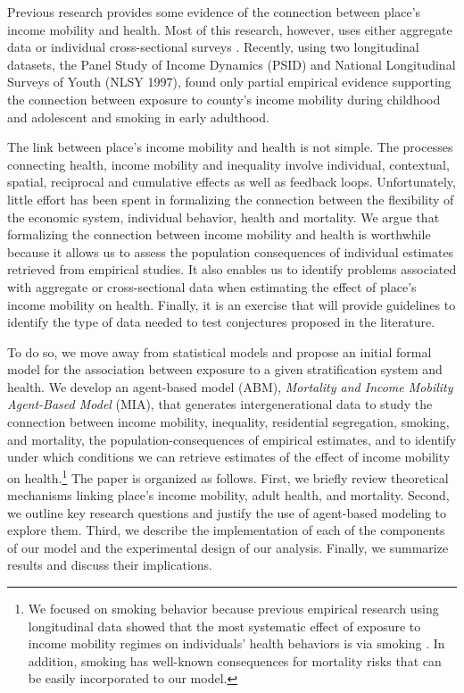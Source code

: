 \documentclass[class=article, crop=false, 12pt]{standalone}
\begin{document}
Previous research provides some evidence of the connection between place's income mobility and health. Most of this research, however, uses either aggregate data \citep{venkataramani2020, daza2018a,venkataramani2015} or individual cross-sectional surveys \citep{venkataramani2016}. Recently, using two longitudinal datasets, the Panel Study of Income Dynamics (PSID) and National Longitudinal Surveys of Youth (NLSY 1997),  \citet{daza2021} found only partial empirical evidence supporting the connection between exposure to county's income mobility during childhood and adolescent and smoking in early adulthood.

The link between place's income mobility and health is not simple. The processes connecting health, income mobility and inequality involve individual, contextual, spatial, reciprocal and cumulative effects as well as feedback loops. Unfortunately, little effort has been spent in formalizing the connection between the flexibility of the economic system, individual behavior, health and mortality. We argue that formalizing the connection between income mobility and health is worthwhile because it allows us to assess the population consequences of individual estimates retrieved from empirical studies. It also enables us to identify problems associated with aggregate or cross-sectional data when estimating the effect of place's income mobility on health. Finally, it is an exercise that will provide guidelines to identify the type of data needed to test conjectures proposed in the literature.

To do so, we move away from statistical models and propose an initial formal model for the association between exposure to a given stratification system and health. We develop an agent-based model (ABM), \textit{Mortality and Income Mobility Agent-Based Model} (MIA), that generates intergenerational data to study the connection between income mobility, inequality, residential segregation, smoking, and mortality, the population-consequences of empirical estimates, and to identify under which conditions we can retrieve estimates of the effect of income mobility on health.\footnote{We focused on smoking behavior because previous empirical research using longitudinal data showed that the most systematic effect of exposure to income mobility regimes on individuals' health behaviors is via smoking \citep{daza2021}. In addition, smoking has well-known consequences for mortality risks that can be easily incorporated to our model.} The paper is organized as follows. First, we briefly review theoretical mechanisms linking place's income mobility, adult health, and mortality. Second, we outline key research questions and justify the use of agent-based modeling to explore them. Third, we describe the implementation of each of the components of our model and the experimental design of our analysis. Finally, we summarize results and discuss their implications.
\end{document}
